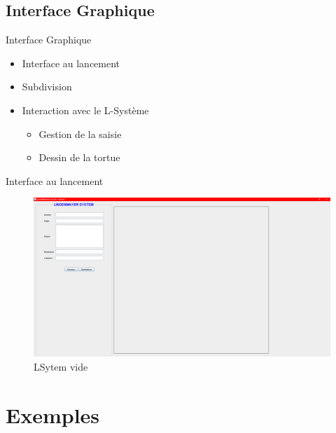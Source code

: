 \documentclass{beamer}
\begin{document}
\subsection{Interface Graphique}
\begin{frame}{Interface Graphique}
    \begin{itemize}
        \item Interface au lancement
        \item Subdivision
        \item Interaction avec le L-Système \\ \begin{itemize}
            \item Gestion de la saisie
            \item Dessin de la tortue
        \end{itemize}
    \end{itemize}
\end{frame}
\begin{frame}{Interface au lancement}
    \begin{figure}[h]
	   \includegraphics[width=\textwidth]{./images/LSystemVide.png}
	   \caption{LSytem vide}
    \end{figure}
\end{frame}
\section{Exemples}
\end{document}
